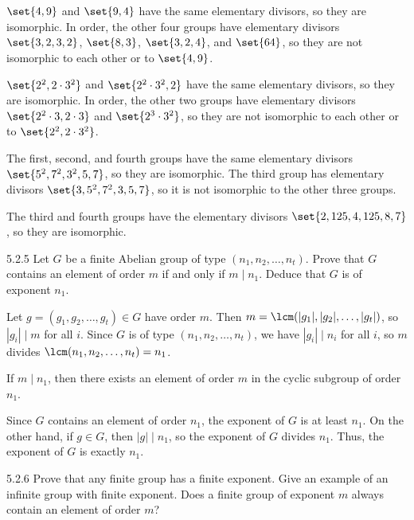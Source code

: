 \begin{solenum}
    \item $\set{4, 9}$ and $\set{9, 4}$ have the same elementary divisors, so they are isomorphic.
	In order, the other four groups have elementary divisors $\set{3, 2, 3, 2}$, $\set{8, 3}$, $\set{3, 2, 4}$, and $\set{64}$, so they are not isomorphic to each other or to $\set{4, 9}$.
    \item $\set{2^2, 2 \cdot 3^2}$ and $\set{2^2 \cdot 3^2, 2}$ have the same elementary divisors, so they are isomorphic.
	In order, the other two groups have elementary divisors $\set{2^2 \cdot 3, 2 \cdot 3}$ and $\set{2^3 \cdot 3^2}$, so they are not isomorphic to each other or to $\set{2^2, 2 \cdot 3^2}$.
    \item The first, second, and fourth groups have the same elementary divisors $\set{5^2, 7^2, 3^2, 5, 7}$, so they are isomorphic.
	The third group has elementary divisors $\set{3, 5^2, 7^2, 3, 5, 7}$, so it is not isomorphic to the other three groups.
    \item The third and fourth groups have the elementary divisors $\set{2, 125, 4, 125, 8, 7}$, so they are isomorphic.
\end{solenum}

\begin{exercise}{5.2.5}
    Let $G$ be a finite Abelian group of type $(n_1, n_2, \ldots, n_t)$.
	Prove that $G$ contains an element of order $m$ if and only if $m \mid n_1$.
	Deduce that $G$ is of exponent $n_1$.
\end{exercise}

\begin{soliff}
    \rightimp Let $g = (g_1, g_2, \ldots, g_t) \in G$ have order $m$.
	Then $m = \lcm(|g_1|, |g_2|, \ldots, |g_t|)$, so $|g_i| \mid m$ for all $i$.
	Since $G$ is of type $(n_1, n_2, \ldots, n_t)$, we have $|g_i| \mid n_i$ for all $i$, so $m$ divides $\lcm(n_1, n_2, \ldots, n_t) = n_1$.

    \leftimp If $m \mid n_1$, then there exists an element of order $m$ in the cyclic subgroup of order $n_1$.

    Since $G$ contains an element of order $n_1$, the exponent of $G$ is at least $n_1$.
	On the other hand, if $g \in G$, then $|g| \mid n_1$, so the exponent of $G$ divides $n_1$.
	Thus, the exponent of $G$ is exactly $n_1$.
\end{soliff}

\begin{exercise}{5.2.6}
    Prove that any finite group has a finite exponent.
	Give an example of an infinite group with finite exponent.
	Does a finite group of exponent $m$ always contain an element of order $m$?
\end{exercise}

